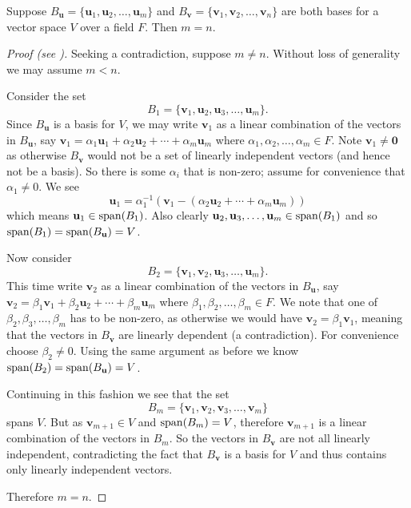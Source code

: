 \begin{theorem}\label{thrm-dimension-theorem-for-finite-bases}
    Suppose $B_\mathbf{u} = \{\mathbf{u}_1, \mathbf{u}_2, \dots, \mathbf{u}_m\}$ and $B_\mathbf{v} = \{\mathbf{v}_1, \mathbf{v}_2, \dots, \mathbf{v}_n\}$ are both bases for a vector space $V$ over a field $F$. Then $m = n$.
\end{theorem}
\begin{proof}[Proof (see {\cite[Theorem 19.1]{gallian_2016}})]
    Seeking a contradiction, suppose $m \neq n$. Without loss of generality we may assume $m < n$.

    Consider the set
    \[
        B_1 = \{\mathbf{v}_1, \mathbf{u}_2, \mathbf{u}_3, \dots, \mathbf{u}_m\}.
    \]
    Since $B_\mathbf{u}$ is a basis for $V$, we may write $\mathbf{v}_1$ as a linear combination of the vectors in $B_\mathbf{u}$, say $\mathbf{v}_1 = \alpha_1\mathbf{u}_1 + \alpha_2\mathbf{u}_2 + \cdots + \alpha_m\mathbf{u}_m$ where $\alpha_1, \alpha_2, \dots, \alpha_m \in F$. Note $\mathbf{v}_1 \neq \mathbf{0}$ as otherwise $B_\mathbf{v}$ would not be a set of linearly independent vectors (and hence not be a basis). So there is some $\alpha_i$ that is non-zero; assume for convenience that $\alpha_1 \neq 0$. We see
    \[
        \mathbf{u}_1 = \alpha_1^{-1}\left(\mathbf{v}_1 - \left(\alpha_2\mathbf{u}_2 + \cdots + \alpha_m\mathbf{u}_m\right)\right)
    \]
    which means $\mathbf{u}_1 \in \mathrm{span}(B_1)$. Also clearly $\mathbf{u}_2, \mathbf{u}_3, \dots, \mathbf{u}_m \in \mathrm{span}(B_1)$ and so $\mathrm{span}(B_1) = \mathrm{span}(B_\mathbf{u}) = V$.

    Now consider
    \[
        B_2 = \{\mathbf{v}_1, \mathbf{v}_2, \mathbf{u}_3, \dots, \mathbf{u}_m\}.
    \]
    This time write $\mathbf{v}_2$ as a linear combination of the vectors in $B_\mathbf{u}$, say $\mathbf{v}_2 = \beta_1\mathbf{v}_1 + \beta_2\mathbf{u}_2 + \cdots + \beta_m\mathbf{u}_m$ where $\beta_1, \beta_2, \dots, \beta_m \in F$. We note that one of $\beta_2, \beta_3, \dots, \beta_m$ has to be non-zero, as otherwise we would have $\mathbf{v}_2 = \beta_1\mathbf{v}_1$, meaning that the vectors in $B_\mathbf{v}$ are linearly dependent (a contradiction). For convenience choose $\beta_2 \neq 0$. Using the same argument as before we know $\mathrm{span}(B_2) = \mathrm{span}(B_\mathbf{u}) = V$.

    Continuing in this fashion we see that the set
    \[
        B_m = \{\mathbf{v}_1, \mathbf{v}_2, \mathbf{v}_3, \dots, \mathbf{v}_m\}
    \]
    spans $V$. But as $\mathbf{v}_{m+1} \in V$ and $\mathrm{span}(B_m) = V$, therefore $\mathbf{v}_{m+1}$ is a linear combination of the vectors in $B_m$. So the vectors in $B_\mathbf{v}$ are not all linearly independent, contradicting the fact that $B_\mathbf{v}$ is a basis for $V$ and thus contains only linearly independent vectors.

    Therefore $m = n$.
\end{proof}

